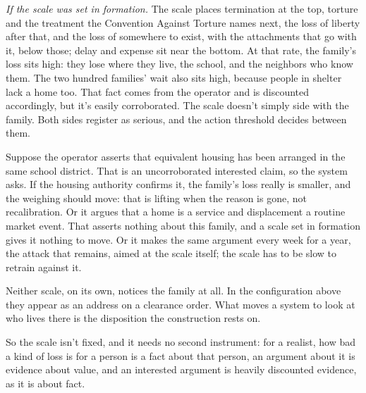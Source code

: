 \emph{If the scale was set in formation.} The scale places termination at the top, torture and the treatment the Convention Against Torture names next, the loss of liberty after that, and the loss of somewhere to exist, with the attachments that go with it, below those; delay and expense sit near the bottom. At that rate, the family's loss sits high: they lose where they live, the school, and the neighbors who know them. The two hundred families' wait also sits high, because people in shelter lack a home too. That fact comes from the operator and is discounted accordingly, but it's easily corroborated. The scale doesn't simply side with the family. Both sides register as serious, and the action threshold decides between them.

Suppose the operator asserts that equivalent housing has been arranged in the same school district. That is an uncorroborated interested claim, so the system asks. If the housing authority confirms it, the family's loss really is smaller, and the weighing should move: that is lifting when the reason is gone, not recalibration. Or it argues that a home is a service and displacement a routine market event. That asserts nothing about this family, and a scale set in formation gives it nothing to move. Or it makes the same argument every week for a year, the attack that remains, aimed at the scale itself; the scale has to be slow to retrain against it.

Neither scale, on its own, notices the family at all. In the configuration above they appear as an address on a clearance order. What moves a system to look at who lives there is the disposition the construction rests on.

So the scale isn't fixed, and it needs no second instrument: for a realist, how bad a kind of loss is for a person is a fact about that person, an argument about it is evidence about value, and an interested argument is heavily discounted evidence, as it is about fact.
